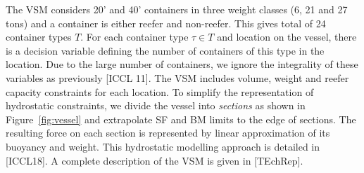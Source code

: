 \documentclass{llncs}
\begin{document}
The VSM considers 20' and 40' containers in three weight classes (6, 21 and 27 tons) and a container is either reefer and non-reefer. This gives total of 24 container types $T$. For each container type $\tau \in T$ and location on the vessel, there is a decision variable defining the number of containers of this type in the location. Due to the large number of containers, we ignore the integrality of these variables as previously [ICCL 11]. The VSM includes volume, weight and reefer capacity constraints for each location. To simplify the representation of hydrostatic constraints, we divide the vessel into \emph{sections} as shown in Figure~\ref{fig:vessel} and extrapolate SF and BM limits to the edge of sections. The resulting force on each section is represented by linear approximation of its buoyancy and weight. This hydrostatic modelling approach is detailed in [ICCL18]. A complete description of the VSM is given in [TEchRep]. 
\end{document}
